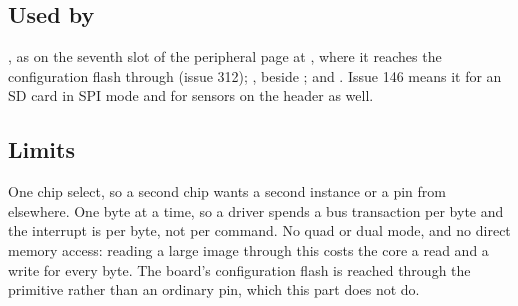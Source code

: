 \subsection*{Used by}

, as  on the seventh slot of the peripheral page at
, where it reaches the configuration flash through
 (issue 312); , beside ;
and . Issue 146 means it for an SD card in SPI mode and
for sensors on the header as well.

\subsection*{Limits}

One chip select, so a second chip wants a second instance or a pin
from elsewhere. One byte at a time, so a driver spends a bus
transaction per byte and the interrupt is per byte, not per command.
No quad or dual mode, and no direct memory access: reading a large
image through this costs the core a read and a write for every byte.
The board's configuration flash is reached through the
 primitive rather than an ordinary pin, which this
part does not do.
